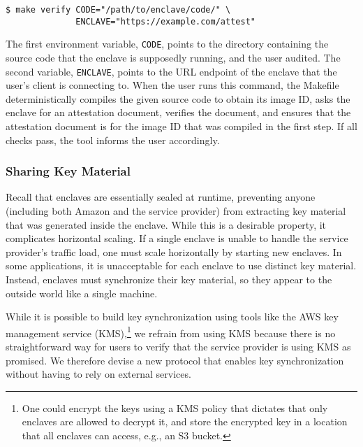 \begin{lstlisting}[numbers=none,basicstyle=\small\ttfamily]
$ make verify CODE="/path/to/enclave/code/" \
              ENCLAVE="https://example.com/attest"
\end{lstlisting}

The first environment variable, \texttt{CODE}, points to the directory
containing the source code that the enclave is supposedly running, and the user
audited.  The second variable, \texttt{ENCLAVE}, points to the URL endpoint of
the enclave that the user's client is connecting to.  When the user runs this
command, the Makefile deterministically compiles the given source code to
obtain its image ID, asks the enclave for an attestation document, verifies the
document, and ensures that the attestation document is for the image ID that
was compiled in the first step.  If all checks pass, the tool informs the user
accordingly.

\subsubsection{Sharing Key Material}
\label{sec:sync}

Recall that enclaves are essentially sealed at runtime, preventing anyone
(including both Amazon and the service provider) from extracting key material
that was generated inside the enclave.  While this is a desirable property, it
complicates horizontal scaling.  If a single enclave is unable to handle the
service provider's traffic load, one must scale horizontally by starting new
enclaves.  In some applications, it is unacceptable for each enclave to use
distinct key material.  Instead, enclaves must synchronize their key material,
so they appear to the outside world like a single machine.

While it is possible to build key synchronization using tools like the AWS key
management service (KMS),\footnote{One could encrypt the keys using a KMS
policy that dictates that only enclaves are allowed to decrypt it, and store
the encrypted key in a location that all enclaves can access, e.g., an S3
bucket.} we refrain from using KMS because there is no straightforward way for
users to verify that the service provider is using KMS as promised.  We
therefore devise a new protocol that enables key synchronization without having
to rely on external services.

